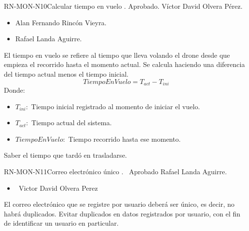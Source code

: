 %
\begin{BusinessRule}{RN-MON-N10}{Calcular tiempo en vuelo}
	{\bcDerivation}
	{\btTimer}
	{\blControlling}
	.
	\BRItem[Estado] Aprobado.
	 Víctor David Olvera Pérez.
	 \cdtEmpty
	\begin{itemize}
		\item Alan Fernando Rincón Vieyra.
		\item Rafael Landa Aguirre.
	\end{itemize}
	\BRItem[Descripción] El tiempo en vuelo se refiere al tiempo que lleva 
volando el drone desde que empieza el recorrido hasta el momento actual. Se 
calcula haciendo una diferencia del tiempo actual menos el tiempo inicial.
	\BRItem[Sentencia]
	\begin{equation*}
	TiempoEnVuelo = T_{act} - T_{ini}
	\end{equation*}
	Donde:
		\begin{itemize}
		\item \texttt{$T_{ini}:$} Tiempo inicial registrado al momento 
		de iniciar el vuelo.
		\item \texttt{$T_{act}:$} Tiempo actual del sistema.
		\item \texttt{$TiempoEnVuelo:$} Tiempo recorrido hasta ese 
		momento.
		\end{itemize}
	\BRItem[Motivación] Saber el tiempo que tardó en trasladarse.
\end{BusinessRule}

%
\begin{BusinessRule}{RN-MON-N11}{Correo electrónico único}
	{\bcIntegridad}
	{\btEnabler}
	{\blControlling}
	.
	\BRItem[Estado] \ Aprobado
	 Rafael Landa Aguirre.
	 \cdtEmpty
	\begin{itemize}
		\item \ Victor David Olvera Perez
	\end{itemize}
	\BRItem[Descripción] El correo electrónico que se registre por usuario
	deberá ser único, es decir, no habrá duplicados.
	\BRItem[Motivación] Evitar duplicados en datos registrados por usuario, 
	con el fin de identificar un usuario en particular.
\end{BusinessRule}

